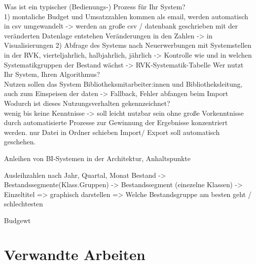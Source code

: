 Was ist ein typischer (Bedienungs-) Prozess für Ihr System?\\
1) montaliche Budget und Umsatzzahlen kommen als email, werden automatisch in csv umgewandelt -> werden an große csv / datenbank geschrieben
mit der veränderten Datenlage entstehen Veränderungen in den Zahlen -> in Visualisierungen
2) Abfrage des Systems nach Neuerwerbungen mit Systemstellen in der RVK, vierteljahrlich, halbjahrlich, jährlich -> Kontrolle wie und in welchen Systematikgruppen
der Bestand wächst -> RVK-Systematik-Tabelle
Wer nutzt Ihr System, Ihren Algorithmus?\\
Nutzen sollen das System Bibliotheksmitarbeiter:innen und Bibliotheksleitung, auch zum Einspeisen der daten -> Fallback, Fehler abfangen beim Import
Wodurch ist dieses Nutzungsverhalten gekennzeichnet?\\
wenig bis keine Kenntnisse -> soll leicht nutzbar sein ohne große Vorkenntnisse durch automatisierte Prozesse zur Gewinnung der Ergebnisse konzentriert werden.
nur Datei in Ordner schieben
Import/ Export  soll automatisch geschehen.

Anleihen von BI-Systemen in der Architektur, Anhaltspunkte 

Ausleihzahlen nach Jahr, Quartal, Monat
Bestand -> Bestandssegmente(Klass.Gruppen) -> Bestandssegment (einezelne Klassen) -> Einzeltitel => graphisch darstellen
=> Welche Bestandsgruppe am besten geht / schlechtesten

Budgewt





\section{Verwandte Arbeiten}


